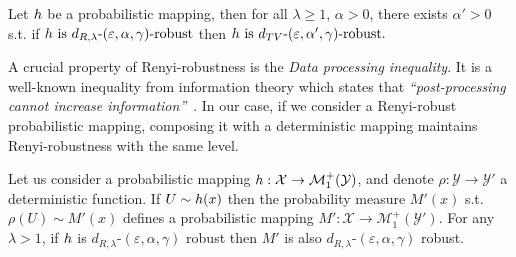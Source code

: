
\begin{prop}
\label{prop:RobustTV}
Let $h$ be a probabilistic mapping, then for all $\lambda\geq1$, $\alpha > 0$, there exists $\alpha' > 0$ s.t. if $h \text{ is }  d_{R,\lambda}\text{-}(\varepsilon, \alpha, \gamma)\text{-robust}$ then $h \text{ is } d_{TV}\text{-}(\varepsilon, \alpha', \gamma)\text{-robust}.$

\end{prop}

A crucial property of Renyi-robustness is the \textit{Data processing inequality}. It is a well-known inequality from information theory which states that \textit{``post-processing cannot increase information''}~\citep{cover2012elements,beaudry2011intuitive}. In our case, if we consider a Renyi-robust probabilistic mapping, composing it with a deterministic mapping maintains Renyi-robustness with the same level.



\begin{prop}
\label{prop::postprocessing} 
Let us consider a probabilistic mapping $h:\mathcal{X}\rightarrow\mathcal{M}_1^+(\mathcal{Y})$, and denote $\rho:\mathcal{Y}\rightarrow\mathcal{Y}'$ a deterministic function.
If $U\sim h(x)$ then the probability measure $M'(x)$ s.t. $\rho(U) \sim M'(x)$ defines a probabilistic mapping $M':\mathcal{X}\rightarrow\mathcal{M}_1^+(\mathcal{Y}')$. For any $\lambda>1$, if $h$ is $d_{R,\lambda}$-$(\varepsilon,\alpha,\gamma)$ robust then $M'$ is also $d_{R,\lambda}$-$(\varepsilon,\alpha,\gamma)$ robust.
\end{prop}

